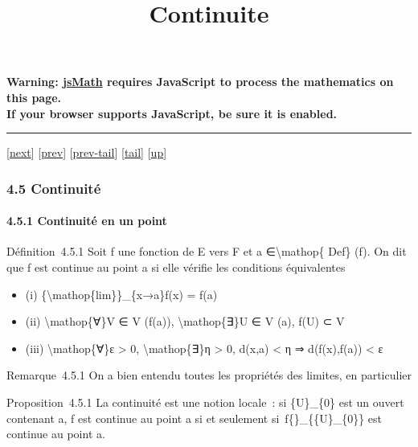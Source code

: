 \documentclass[]{article}
\title{Continuite}
\author{}
\date{}
\begin{document}
\maketitle

\textbf{Warning: \href{http://www.math.union.edu/locate/jsMath}{jsMath}
requires JavaScript to process the mathematics on this page.\\ If your
browser supports JavaScript, be sure it is enabled.}

\begin{center}\rule{3in}{0.4pt}\end{center}

{[}\href{coursse23.html}{next}{]} {[}\href{coursse21.html}{prev}{]}
{[}\href{coursse21.html\#tailcoursse21.html}{prev-tail}{]}
{[}\hyperref[tailcoursse22.html]{tail}{]}
{[}\href{coursch5.html\#coursse22.html}{up}{]}

\subsubsection{4.5 Continuité}

\paragraph{4.5.1 Continuité en un point}

Définition~4.5.1 Soit f une fonction de E vers F et a
∈\textbackslash{}mathop\{ Def\} (f). On dit que f est continue au point
a si elle vérifie les conditions équivalentes

\begin{itemize}
\itemsep1pt\parskip0pt
\item
  (i) \{\textbackslash{}mathop\{lim\}\}\_\{x→a\}f(x) = f(a)
\item
  (ii) \textbackslash{}mathop\{∀\}V ∈ V (f(a)),
  \textbackslash{}mathop\{∃\}U ∈ V (a), f(U) ⊂ V
\item
  (iii) \textbackslash{}mathop\{∀\}ε \textgreater{} 0,
  \textbackslash{}mathop\{∃\}η \textgreater{} 0, d(x,a) \textless{} η ⇒
  d(f(x),f(a)) \textless{} ε
\end{itemize}

Remarque~4.5.1 On a bien entendu toutes les propriétés des limites, en
particulier

Proposition~4.5.1 La continuité est une notion locale~: si \{U\}\_\{0\}
est un ouvert contenant a, f est continue au point a si et seulement
si~f\{\textbar{}\}\_\{\{U\}\_\{0\}\} est continue au point a.
\end{document}
